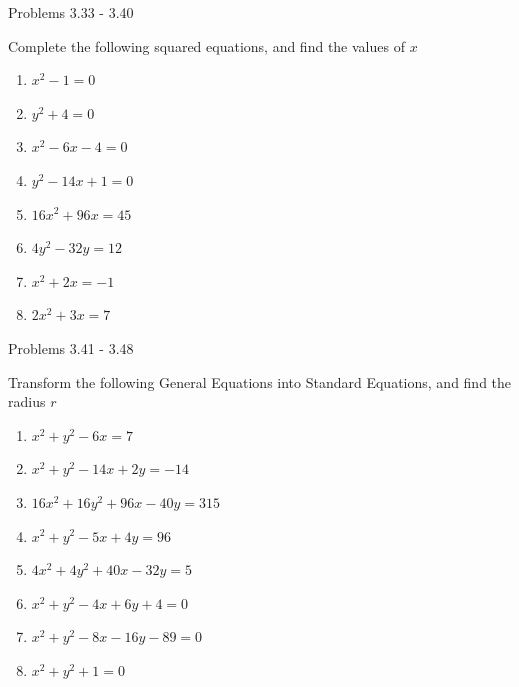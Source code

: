 \documentclass[14pt,aspectratio=169]{beamer}
\begin{document}
\begin{frame}{Problems 3.33 - 3.40}
 \begin{exampleblock}{Complete the following squared equations, and find the values of $x$}
  \begin{enumerate}
   \item $x^2 - 1 = 0$
   \item $y^2 + 4 = 0$
   \item $x^2 - 6x - 4 = 0$
   \item $y^2 - 14x + 1= 0$
   \item $16x^2 + 96x = 45$
   \item $4y^2 - 32y = 12$
   \item $x^2 + 2x = -1$
   \item $2x^2 + 3x = 7$
  \end{enumerate}

 \end{exampleblock}

\end{frame}


\begin{frame}{Problems 3.41 - 3.48}
 \begin{exampleblock}{Transform the following General Equations into Standard Equations, and find the radius $r$}
  \begin{enumerate}
   \item $x^2 + y^2 - 6x = 7$
   \item $x^2 + y^2 -14x + 2y = -14$
   \item $16x^2 + 16y^2 + 96x-40y=315$
   \item $x^2 +y^2 -5x +4y = 96$
   \item $4x^2 + 4y^2 + 40x - 32y = 5$
   \item $x^2 + y^2 - 4x + 6y + 4 = 0$
   \item $x^2 + y^2 - 8x -16y-89=0$
   \item $x^2 + y^2 + 1 = 0$
  \end{enumerate}

 \end{exampleblock}

\end{frame}
\end{document}

